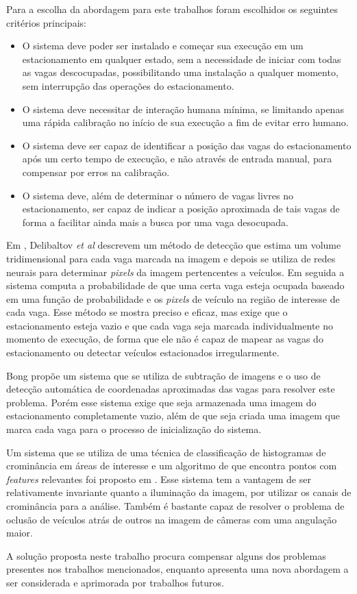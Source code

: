 Para a escolha da abordagem para este trabalhos foram escolhidos os seguintes critérios principais:

\begin{itemize}
	
	\item O sistema deve poder ser instalado e começar sua execução em um estacionamento em qualquer estado, sem a necessidade de iniciar com todas as vagas descocupadas, possibilitando uma instalação a qualquer momento, sem interrupção das operações do estacionamento.
	\item O sistema deve necessitar de interação humana mínima, se limitando apenas uma rápida calibração no início de sua execução a fim de evitar erro humano.
	\item O sistema deve ser capaz de identificar a posição das vagas do estacionamento após um certo tempo de execução, e não através de entrada manual, para compensar por erros na calibração.
	\item O sistema deve, além de determinar o número de vagas livres no estacionamento, ser capaz de indicar a posição aproximada de tais vagas de forma a facilitar ainda mais a busca por uma vaga desocupada.
	
\end{itemize}

Em \cite{delibaltov2013parking}, Delibaltov \textit{et al} descrevem um método de detecção que estima um volume tridimensional para cada vaga marcada na imagem e depois se utiliza de redes neurais para determinar \textit{pixels} da imagem pertencentes a veículos. Em seguida a sistema computa a probabilidade de que uma certa vaga esteja ocupada baseado em uma função de probabilidade e os \textit{pixels} de veículo na região de interesse de cada vaga. Esse método se mostra preciso e eficaz, mas exige que o estacionamento esteja vazio e que cada vaga seja marcada individualmente no momento de execução, de forma que ele não é capaz de mapear as vagas do estacionamento ou detectar veículos estacionados irregularmente.

Bong \cite{bong2008integrated} propõe um sistema que se utiliza de subtração de imagens e o uso de detecção automática de coordenadas aproximadas das vagas para resolver este problema. Porém esse sistema exige que seja armazenada uma imagem do estacionamento completamente vazio, além de que seja criada uma imagem que marca cada vaga para o processo de inicialização do sistema.

Um sistema que se utiliza de uma técnica de classificação de histogramas de crominância em áreas de interesse e um algoritmo de que encontra pontos com \textit{features} relevantes foi proposto em \cite{true2007vacant}. Esse sistema tem a vantagem de ser relativamente invariante quanto a iluminação da imagem, por utilizar os canais de crominância para a análise. Também é bastante capaz de resolver o problema de oclusão de veículos atrás de outros na imagem de câmeras com uma angulação maior.

A solução proposta neste trabalho procura compensar alguns dos problemas presentes nos trabalhos mencionados, enquanto apresenta uma nova abordagem a ser considerada e aprimorada por trabalhos futuros.

